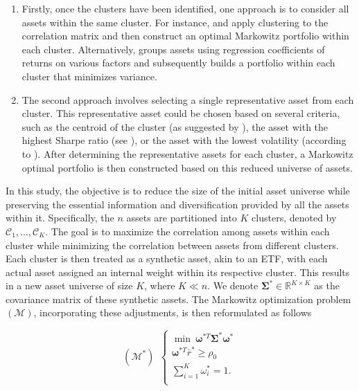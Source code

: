 \documentclass[sigconf]{acmart}
\begin{document}
\begin{enumerate}
    \item Firstly, once the clusters have been identified, one approach is to consider all assets within the same cluster. For instance, \cite{León} and \cite{Tola} apply clustering to the correlation matrix and then construct an optimal Markowitz portfolio within each cluster. Alternatively, \cite{Gatta} groups assets using regression coefficients of returns on various factors and subsequently builds a portfolio within each cluster that minimizes variance.
    \item The second approach involves selecting a single representative asset from each cluster. This representative asset could be chosen based on several criteria, such as the centroid of the cluster (as suggested by \cite{TolunTayali}), the asset with the highest Sharpe ratio (see \cite{Tang}), or the asset with the lowest volatility (according to \cite{Wang}). After determining the representative assets for each cluster, a Markowitz optimal portfolio is then constructed based on this reduced universe of assets.
\end{enumerate}

In this study, the objective is to reduce the size of the initial asset universe while preserving the essential information and diversification provided by all the assets within it. Specifically, the \( n \) assets are partitioned into \( K \) clusters, denoted by \( \mathcal{C}_1, \ldots, \mathcal{C}_K \). The goal is to maximize the correlation among assets within each cluster while minimizing the correlation between assets from different clusters. Each cluster is then treated as a synthetic asset, akin to an ETF, with each actual asset assigned an internal weight within its respective cluster. This results in a new asset universe of size \( K \), where \( K \ll n \). We denote \( \boldsymbol{\Sigma}^* \in \mathbb{R}^{K \times K} \) as the covariance matrix of these synthetic assets. The Markowitz optimization problem \((\boldsymbol{\mathcal{M}})\), incorporating these adjustments, is then reformulated as follows

\begin{equation*}
    (\boldsymbol{\mathcal{M}}^*) ~~
    \left\{
        \begin{array}{ll}
            \min ~ \boldsymbol{\omega}^{*T}\boldsymbol{\Sigma}^*\boldsymbol{\omega}^* \\
            \boldsymbol{\omega}^{*T} \bar{r}^* \geq \rho_0\\
            \sum_{i=1}^K \omega_i^* = 1. \\
        \end{array}
    \right.
    \label{markowitzproblem-cluster}
\end{equation*}
\end{document}
